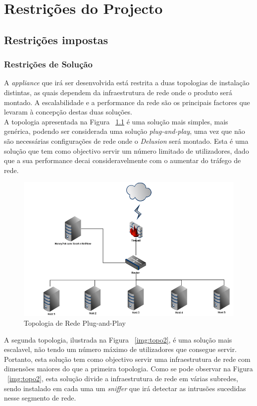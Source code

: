 \chapter{Restrições do Projecto}
\minitoc
\section{Restrições impostas}
\subsection{Restrições de Solução}
    A \textit{appliance} que irá ser desenvolvida está restrita a duas topologias de instalação distintas, as quais dependem da infraestrutura de rede onde o produto será montado. A escalabilidade e a performance da rede são os principais factores que levaram à concepção destas duas soluções. \\

    A topologia apresentada na Figura ~\ref{img:topo1} é uma solução mais simples, mais genérica, podendo ser considerada uma solução \textit{plug-and-play}, uma vez que não são necessárias configurações de rede onde o \textit{Delusion} será montado. Esta é uma solução que tem como objectivo servir um número limitado de utilizadores, dado que a sua performance decai consideravelmente com o aumentar do tráfego de rede. \\

\begin{figure}
	\centering	
	\includegraphics[scale=0.6]{images/topologia1.png}
	\caption{Topologia de Rede Plug-and-Play}
    \label{img:topo1}
\end{figure}

    A segunda topologia, ilustrada na Figura ~\ref{img:topo2}, é uma solução mais escalavel, não tendo um número máximo de utilizadores que consegue servir. Portanto, esta solução tem como objectivo servir uma infraestrutura de rede com dimensões maiores do que a primeira topologia. Como se pode observar na Figura ~\ref{img:topo2}, esta solução divide a infraestrutura de rede em várias subredes, sendo instalado em cada uma um \textit{sniffer} que irá detectar as intrusões sucedidas nesse segmento de rede.

